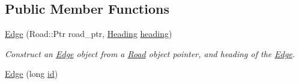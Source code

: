 \subsection*{Public Member Functions}
\begin{DoxyCompactItemize}
\item 
\hyperlink{classgeo_1_1Edge_a0e93626d5bf90f09430535a501ad7850}{Edge} (Road\+::\+Ptr road\+\_\+ptr, \hyperlink{namespacegeo_ae7a495a59f07984a90e0b609bc038df9}{Heading} \hyperlink{classgeo_1_1Edge_a42070020fa7326a102316b7aab57801b}{heading})
\begin{DoxyCompactList}\small\item\em Construct an \hyperlink{classgeo_1_1Edge}{Edge} object from a \hyperlink{classgeo_1_1Road}{Road} object pointer, and heading of the \hyperlink{classgeo_1_1Edge}{Edge}. \end{DoxyCompactList}\item 
\hyperlink{classgeo_1_1Edge_a47b947fe3b87e6a28edf790c83e39fb0}{Edge} (long \hyperlink{classgeo_1_1Edge_a459268032f5d9ccf412b66569f5ac258}{id})\hypertarget{classgeo_1_1Edge_a47b947fe3b87e6a28edf790c83e39fb0}{}\label{classgeo_1_1Edge_a47b947fe3b87e6a28edf790c83e39fb0}


\end{DoxyCompactItemize}
